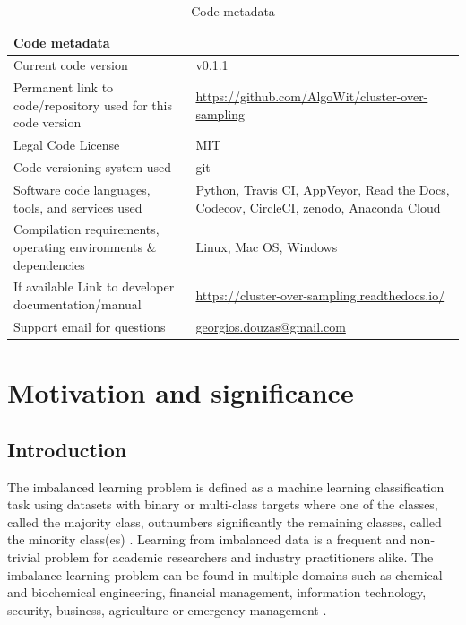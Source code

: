 \documentclass[preprint,12pt, a4paper]{elsarticle}
\begin{document}
\begin{table}[H]
\begin{tabular}{|p{6.5cm}|p{6.5cm}|}
\hline
Code metadata & \\
\hline
Current code version & v0.1.1 \\
\hline
Permanent link to code/repository used for this code version & \url{https://github.com/AlgoWit/cluster-over-sampling} \\
\hline
Legal Code License & MIT \\
\hline
Code versioning system used & git \\
\hline
Software code languages, tools, and services used & Python, Travis CI, AppVeyor, Read the Docs, Codecov, CircleCI, zenodo, Anaconda Cloud \\
\hline
Compilation requirements, operating environments \& dependencies & Linux, Mac OS, Windows \\
\hline
If available Link to developer documentation/manual & \url{https://cluster-over-sampling.readthedocs.io/} \\
\hline
Support email for questions & \href{mailto:georgios.douzas@gmail.com}{georgios.douzas@gmail.com} \\
\hline
\end{tabular}
\caption{Code metadata}
\label{} 
\end{table}

\linenumbers


\section{Motivation and significance}
\label{motivation}

\subsection{Introduction}
\label{introduction}

The imbalanced learning problem is defined as a machine learning classification task using datasets with binary or multi-class targets where one of the classes, called the majority class, outnumbers significantly the remaining classes, called the minority class(es) \cite{Chawla2003}. Learning from imbalanced data is a frequent and non-trivial problem for academic researchers and industry practitioners alike. The imbalance learning problem can be found in multiple domains such as chemical and biochemical engineering, financial management, information technology, security, business, agriculture or emergency management \cite{Haixiang2017}.
\end{document}
